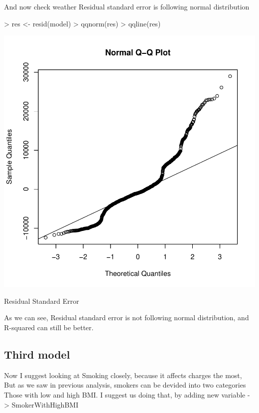\documentclass{article}
\begin{document}
And now check weather Residual standard error is following normal distribution

\begin{centerfig}
\begin{Schunk}
\begin{Sinput}
> res <- resid(model)
> qqnorm(res)
> qqline(res)
\end{Sinput}
\end{Schunk}
\includegraphics{Untitled-055}
\caption{Residual Standard Error}
\end{centerfig}

As we can see, Residual standard error is not following normal distribution, 
and R-squared can still be better.

\subsection{Third model}
\label{sec:Third}
Now I suggest looking at Smoking closely, because it affects charges the most,
But as we saw in previous analysis, smokers can be devided into two categories
Those with low and high BMI. I suggest us doing that, by adding new variable -> SmokerWithHighBMI
\end{document}
